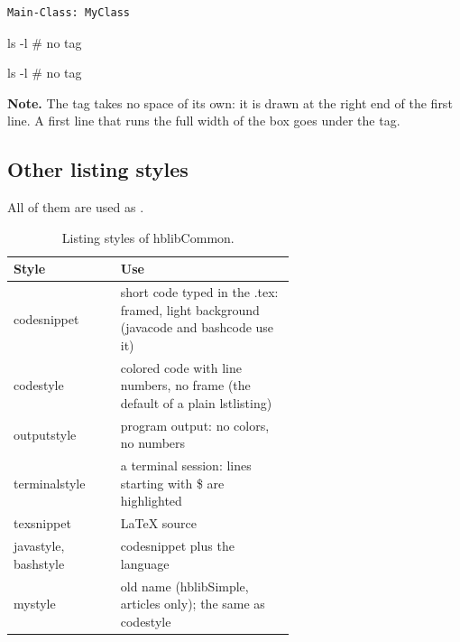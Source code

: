 \documentclass[11pt]{amsart}         %
\newcommand{\hNote}[1]{\par\smallskip\noindent\colorbox{codebg}{\parbox{\dimexpr\linewidth-2\fboxsep}{\small\raggedright\textbf{Note.} #1}}\par\smallskip}
\begin{document}
\begin{lstlisting}[style=outputstyle, frame=single, rulecolor=\color{gray!40}]
Main-Class: MyClass
\end{lstlisting}

\begin{texcode}
\hCodeTagsfalse
\begin{bashcode}
ls -l    # no tag
\end{bashcode}
\hCodeTagstrue
\end{texcode}

\hCodeTagsfalse
\begin{bashcode}
ls -l    # no tag
\end{bashcode}
\hCodeTagstrue

\hNote{The tag takes no space of its own: it is drawn at the right end of the first line.
A first line that runs the full width of the box goes under the tag.}


\subsection{Other listing styles}

All of them are used as .

\begin{table}[htbp]
\caption{Listing styles of hblibCommon.}
\label{tbl:styles}
\small
\begin{tabular}{@{}>{\ttfamily}l >{\raggedright\arraybackslash}p{0.62\linewidth}@{}}
	\toprule
	\textrm{\textbf{Style}} & \textbf{Use} \\
	\midrule
	codesnippet   & short code typed in the .tex: framed, light background (javacode and bashcode use it) \\
	codestyle     & colored code with line numbers, no frame (the default of a plain lstlisting) \\
	outputstyle   & program output: no colors, no numbers \\
	terminalstyle & a terminal session: lines starting with \$ are highlighted \\
	texsnippet    & LaTeX source \\
	javastyle, bashstyle & codesnippet plus the language \\
	mystyle       & old name (hblibSimple, articles only); the same as codestyle \\
	\bottomrule
\end{tabular}
\end{table}%
\end{document}
